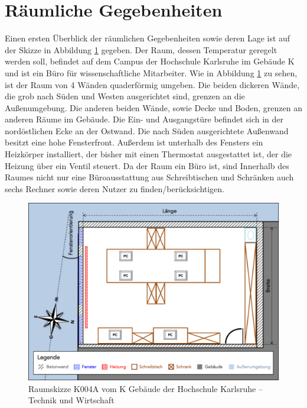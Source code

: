 \section{Räumliche Gegebenheiten}
Einen ersten Überblick der räumlichen Gegebenheiten sowie deren Lage ist auf der Skizze in Abbildung \ref{fig:skizzek004a} gegeben. Der Raum, dessen Temperatur geregelt werden soll, befindet auf dem Campus der Hochschule Karlsruhe im Gebäude K und ist ein Büro für wissenschaftliche Mitarbeiter. 
Wie in Abbildung \ref{fig:skizzek004a} zu sehen, ist der Raum von 4 Wänden quaderförmig umgeben. Die beiden dickeren Wände, die grob nach Süden und Westen ausgerichtet sind, grenzen an die Außenumgebung. Die anderen beiden Wände, sowie Decke und Boden, grenzen an anderen Räume im Gebäude. Die Ein- und Ausgangstüre befindet sich in der nordöstlichen Ecke an der Ostwand. Die nach Süden ausgerichtete Außenwand besitzt eine hohe Fensterfront. Außerdem ist unterhalb des Fensters ein Heizkörper installiert, der bisher mit einen Thermostat ausgestattet ist, der die Heizung über ein Ventil  steuert.
Da der Raum ein Büro ist, sind Innerhalb des Raumes nicht nur eine Büroausstattung aus Schreibtischen und Schränken auch sechs Rechner sowie deren Nutzer zu finden/berücksichtigen.

\begin{figure}
\centering
\includegraphics[width=\textwidth]{abbildungen/20160102_k004a}
\caption[Raumskizze K004A vom K Gebäude der Hochschule Karlsruhe -- Technik und Wirtschaft]{Raumskizze K004A vom K Gebäude der Hochschule Karlsruhe -- Technik und Wirtschaft}
\label{fig:skizzek004a}
\end{figure}

